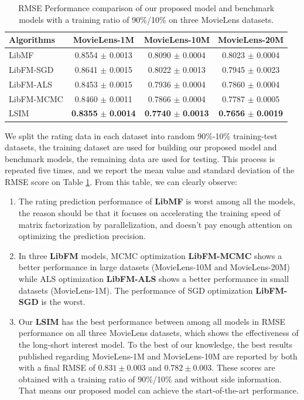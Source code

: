 \documentclass{llncs}
\begin{document}
\begin{table}[htbp]
	\centering
	\caption{RMSE Performance comparison of our proposed model and benchmark models
		with a training ratio of 90\%/10\% on three MovieLens datasets.}
	\label{tab:msre}
	\begin{tabular}{|l|c|c|c|}
		\hline
		\textbf{Algorithms} & \textbf{MovieLens-1M} & \textbf{MovieLens-10M} & \textbf{MovieLens-20M} \\
		\hline
		LibMF      & 0.8554 $\pm$ 0.0013 & 0.8090 $\pm$ 0.0004 & 0.8023 $\pm$ 0.0004 \\
		LibFM-SGD  & 0.8641 $\pm$ 0.0015 & 0.8022 $\pm$ 0.0013 & 0.7945 $\pm$ 0.0023 \\
		LibFM-ALS  & 0.8453 $\pm$ 0.0015 & 0.7936 $\pm$ 0.0004 & 0.7860 $\pm$ 0.0004 \\
		LibFM-MCMC & 0.8460 $\pm$ 0.0011 & 0.7866 $\pm$ 0.0004 & 0.7787 $\pm$ 0.0005 \\
		LSIM       & \textbf{0.8355} $\pm$ \textbf{0.0014} & \textbf{0.7740} $\pm$ \textbf{0.0013} & \textbf{0.7656} $\pm$ \textbf{0.0019} \\
		\hline
	\end{tabular}
\end{table}

We split the rating data in each dataset into random 90\%-10\% training-test
datasets, the training dataset are used for building our proposed model
and benchmark models, the remaining data are used for testing.
This process is repeated five times, and we report the mean value and
standard deviation of the RMSE score on Table \ref{tab:msre}.
From this table, we can clearly observe:
\begin{enumerate}
	\item The rating prediction performance of \textbf{LibMF} is worst among all the models,
	the reason should be that it focuses on accelerating the training speed of matrix
	factorization by parallelization, and doesn't pay enough attention on optimizing
	the prediction precision.
	\item In three \textbf{LibFM} models, MCMC optimization \textbf{LibFM-MCMC} shows
	a better performance in large datasets (MovieLens-10M and MovieLens-20M) while
	ALS optimization \textbf{LibFM-ALS} shows a better performance in small datasets
	(MovieLens-1M). The performance of SGD optimization \textbf{LibFM-SGD} is the worst.
	\item Our \textbf{LSIM} has the best performance between among all models in RMSE
	performance on all three MovieLens datasets, which shows the effectiveness
	of the long-short interest model. To the best of our knowledge, the best results
	published regarding MovieLens-1M and MovieLens-10M are reported by both
	\cite{lee2013local, sedhain2015autorec} with a final RMSE of $0.831 \pm 0.003$
	and $0.782 \pm 0.003$. These scores are obtained with a training ratio of
	90\%/10\% and without side information. That means our proposed model can achieve
	the start-of-the-art performance.
\end{enumerate}
\end{document}
